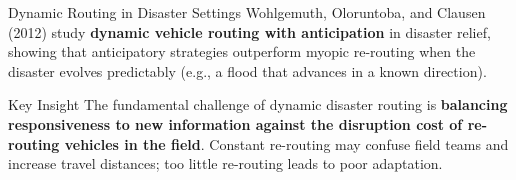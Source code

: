 \documentclass[aspectratio=169,10pt]{beamer}
\begin{document}
\begin{frame}[allowframebreaks]{Dynamic Routing in Disaster Settings}
  \medskip
  Wohlgemuth, Oloruntoba, and Clausen (2012) study
  \textbf{dynamic vehicle routing with anticipation} in disaster relief,
  showing that anticipatory strategies outperform myopic re-routing
  when the disaster evolves predictably (e.g., a flood that advances
  in a known direction).

  \medskip
  \begin{alertblock}{Key Insight}
    The fundamental challenge of dynamic disaster routing is
    \textbf{balancing responsiveness to new information against
    the disruption cost of re-routing vehicles in the field}.
    Constant re-routing may confuse field teams and increase travel
    distances; too little re-routing leads to poor adaptation.
  \end{alertblock}
\end{frame}
\end{document}
